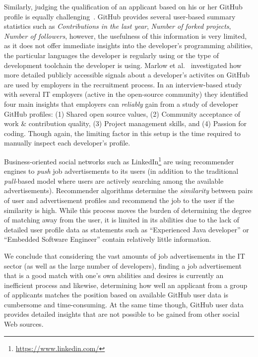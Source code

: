 \documentclass[conference]{IEEEtran}
\begin{document}
Similarly, judging the qualification of an applicant based on his or her GitHub profile is equally challenging~\cite{Singer:2013:MAS:2441776.2441791}. GitHub provides several user-based summary statistics such as \emph{Contributions in the last year}, \emph{Number of forked projects}, \emph{Number of followers}, however, the usefulness of this information is very limited, as it does not offer immediate insights into the developer's programming abilities, the particular languages the developer is regularly using or the type of development toolchain the developer is using. 
Marlow et al.~\cite{Marlow:2013:ATS:2441776.2441794} investigated how more detailed publicly accessible signals about a developer's activites on GitHub are used by employers in the recruitment process. In an interview-based study with several IT employers (active in the open-source community) they identified four main insights that employers can \emph{reliably} gain from a study of developer GitHub profiles: (1) Shared open source values, (2) Community acceptance of work \& contribution quality, (3) Project management skills, and (4) Passion for coding. Though again, the limiting factor in this setup is the time required to manually inspect each developer's profile.

Business-oriented social networks such as LinkedIn\footnote{\url{https://www.linkedin.com/}} are using recommender engines to \emph{push} job advertisements to its users (in addition to the traditional \emph{pull}-based model where users are actively searching among the available advertisements). Recommender algorithms determine the \emph{similarity} between pairs of user and advertisement profiles and recommend the job to the user if the similarity is high. While this process moves the burden of determining the degree of matching away from the user, it is limited in its abilities due to the lack of detailed user profile data as statements such as ``Experienced Java developer'' or ``Embedded Software Engineer'' contain relatively little information.

We conclude that considering the vast amounts of job advertisements in the IT sector (as well as the large number of developers), finding a job advertisement that is a good match with one's own abilities and desires is currently an inefficient process and likewise, determining how well an applicant from a group of applicants matches the position based on available GitHub user data is cumbersome and time-consuming. At the same time though, GitHub user data provides detailed insights that are not possible to be gained from other social Web sources.
\end{document}
